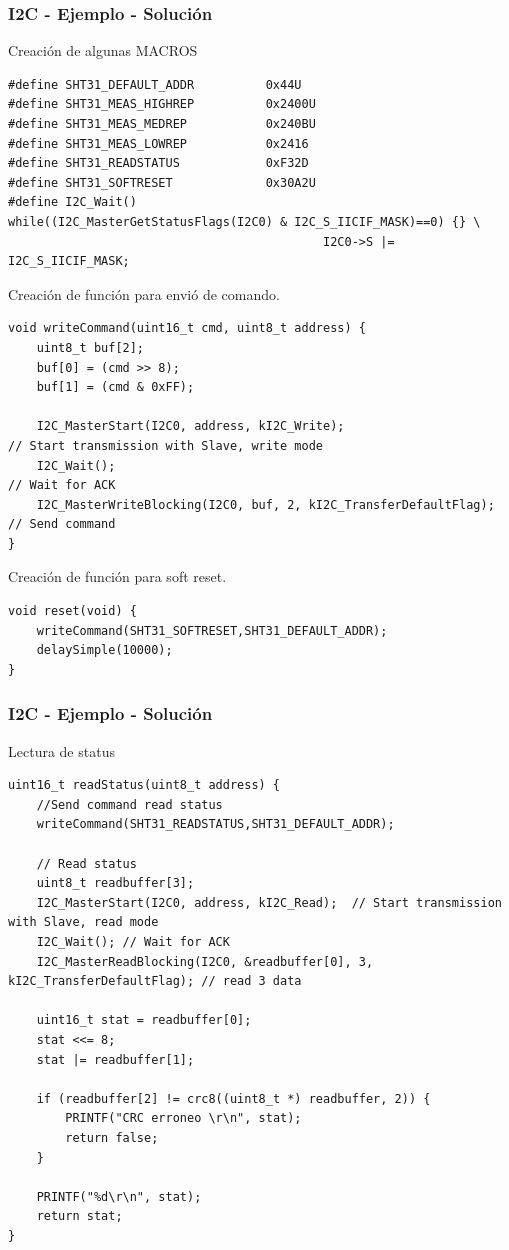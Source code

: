 \documentclass[10.5pt,scale=1.0,t,aspectratio=169,hyperref={pdfpagelabels=false}]{beamer}
\begin{document}
\begin{frame}[fragile]
	\frametitle{I2C - Ejemplo - Solución}
	{\tiny
		Creación de algunas MACROS
		\begin{lstlisting}[style=CStyle]
#define SHT31_DEFAULT_ADDR          0x44U
#define SHT31_MEAS_HIGHREP          0x2400U
#define SHT31_MEAS_MEDREP           0x240BU
#define SHT31_MEAS_LOWREP           0x2416
#define SHT31_READSTATUS            0xF32D
#define SHT31_SOFTRESET             0x30A2U
#define I2C_Wait()					while((I2C_MasterGetStatusFlags(I2C0) & I2C_S_IICIF_MASK)==0) {} \
											I2C0->S |= I2C_S_IICIF_MASK;
		\end{lstlisting}
	
		Creación de función para envió de comando.
		\begin{lstlisting}[style=CStyle]
void writeCommand(uint16_t cmd, uint8_t address) {
	uint8_t buf[2];
	buf[0] = (cmd >> 8);
	buf[1] = (cmd & 0xFF);
	
	I2C_MasterStart(I2C0, address, kI2C_Write);							// Start transmission with Slave, write mode
	I2C_Wait(); 														// Wait for ACK
	I2C_MasterWriteBlocking(I2C0, buf, 2, kI2C_TransferDefaultFlag);	// Send command
}
		\end{lstlisting}
	
	Creación de función para soft reset.
	\begin{lstlisting}[style=CStyle]
void reset(void) {
	writeCommand(SHT31_SOFTRESET,SHT31_DEFAULT_ADDR);
	delaySimple(10000);
}
	\end{lstlisting}
	}
\end{frame}
\begin{frame}[fragile]
	\frametitle{I2C - Ejemplo - Solución}
	{\tiny
		Lectura de status
		\begin{lstlisting}[style=CStyle]
uint16_t readStatus(uint8_t address) {
	//Send command read status
	writeCommand(SHT31_READSTATUS,SHT31_DEFAULT_ADDR);
	
	// Read status
	uint8_t readbuffer[3];
	I2C_MasterStart(I2C0, address, kI2C_Read);	// Start transmission with Slave, read mode
	I2C_Wait();	// Wait for ACK
	I2C_MasterReadBlocking(I2C0, &readbuffer[0], 3, kI2C_TransferDefaultFlag); // read 3 data
	
	uint16_t stat = readbuffer[0];
	stat <<= 8;
	stat |= readbuffer[1];
	
	if (readbuffer[2] != crc8((uint8_t *) readbuffer, 2)) {
		PRINTF("CRC erroneo \r\n", stat);
		return false;
	}
	
	PRINTF("%d\r\n", stat);
	return stat;
}
		\end{lstlisting}		
	}
\end{frame}
\end{document}

